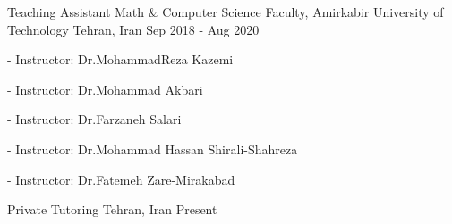 \documentclass[11pt, a4paper]{awesome-cv}
\begin{document}
\begin{cventries}
	
	\cventry
	{Teaching Assistant} %
	{Math \& Computer Science Faculty, Amirkabir University of Technology} %
	{Tehran, Iran} %
	{Sep 2018 - Aug 2020} %
	{
		\begin{cvitems} %
			\item { - Instructor: Dr.MohammadReza Kazemi}
			\item { - Instructor: Dr.Mohammad Akbari}
			\item { - Instructor: Dr.Farzaneh Salari}
			\item { - Instructor: Dr.Mohammad Hassan Shirali-Shahreza }
			\item { - Instructor: Dr.Fatemeh Zare-Mirakabad}
		\end{cvitems}
	}
	
		\cventry
	{Private Tutoring} %
	{ } %
	{Tehran, Iran} %
	{Present} %
	{
		\begin{cvitems} %
			\item {}
			\item {}
			\item {}
			\item {}
			\item {}
		\end{cvitems}
	}



\end{cventries}
\end{document}
